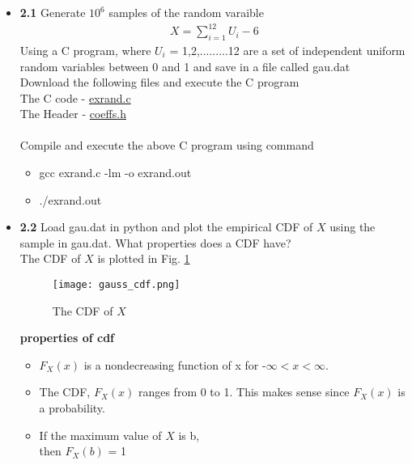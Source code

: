 \documentclass[journal,12pt,twocolumn]{IEEEtran}
\begin{document}
\begin{itemize}
    \item \textbf{2.1} Generate $10^6$ samples of the random varaible 
    \begin{align}
        X = \sum_{i=1}^{12} U_i - 6
    \end{align}
    Using a C program, where $U_i$ = 1,2,.........12 are a set of independent uniform random variables between 0 and 1 and save in a file called gau.dat \\
    \solution Download the following files and execute the C program \\
    The C code - \href{https://github.com/jarpula-Bhanu/Random-numbers/blob/main/codes/exrand.c}{exrand.c} \\
    The Header - \href{https://github.com/jarpula-Bhanu/Random-numbers/blob/main/codes/coeffs.h}{coeffs.h} \\ 
    \\Compile and execute the above C program using command
    \begin{itemize}
        \item gcc exrand.c -lm -o exrand.out
        \item ./exrand.out \\
    \end{itemize} 

    \item \textbf{2.2} Load gau.dat in python and plot the empirical CDF of $X$ using the sample in gau.dat. What properties does a CDF have? \\
    \solution The CDF of $X$ is plotted in Fig. \ref{fig:gauss_cdf}
    \begin{figure}[h]
        \centering
        \texttt{[image: gauss\_cdf.png]}
        \caption{The CDF of $X$}
        \label{fig:gauss_cdf}
    \end{figure}
    \textbf{properties of cdf}
    \begin{itemize}
        \item $F_X(x)$ is a nondecreasing function of x for -$\infty < x < \infty$. 
        \item The CDF, $F_X(x)$ ranges from 0 to 1. This makes sense since $F_X(x)$ is a probability.
        \item If the maximum value of $X$ is b,\\ then $F_X(b)$ = 1 \\
    \end{itemize} 
    

\end{itemize}
\end{document}
